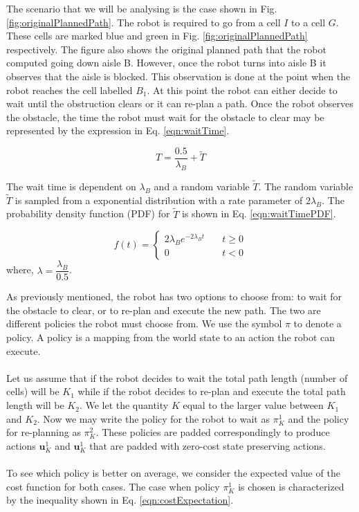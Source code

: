 \documentclass[a4paper,12pt]{article}
\begin{document}
			The scenario that we will be analysing is the case shown in Fig. \ref{fig:originalPlannedPath}. The robot is required to go from a cell $I$ to a cell $G$. These cells are marked blue and green in Fig. \ref{fig:originalPlannedPath} respectively. The figure also shows the original planned path that the robot computed going down aisle B. However, once the robot turns into aisle B it observes that the aisle is blocked. This observation is done at the point when the robot reaches the cell labelled $B_{1}$. At this point the robot can either decide to wait until the obstruction clears or it can re-plan a path. Once the robot observes the obstacle, the time the robot must wait for the obstacle to clear may be represented by the expression in Eq. \ref{eqn:waitTime}. 

			\begin{equation}
				T=\frac{0.5}{\lambda_{B}}+\widetilde{T}
				\label{eqn:waitTime}
			\end{equation}

			The wait time is dependent on $\lambda_{B}$ and a random variable $\widetilde{T}$. The random variable $\widetilde{T}$ is sampled from a exponential distribution with a rate parameter of $2\lambda_{B}$. The probability density function (PDF) for $\widetilde{T}$ is shown in Eq. \ref{eqn:waitTimePDF}. 

			\begin{equation}
				f(t) = 
				\begin{cases}
				2\lambda_{B} e^{-2\lambda_{B} t} & \quad t \geq 0 \\
				0 & \quad t < 0
				\end{cases}
				\label{eqn:waitTimePDF}
			\end{equation}
			where, $\lambda = \dfrac{\lambda_{B}}{0.5}$. 
			
			As previously mentioned, the robot has two options to choose from: to wait for the obstacle to clear, or to re-plan and execute the new path. The two are different policies the robot must choose from. We use the symbol $\pi$ to denote a policy. A policy is a mapping from the world state to an action the robot can execute.
			\\
			\\
			Let us assume that if the robot decides to wait the total path length (number of cells) will be $K_1$ while if the robot decides to re-plan and execute the total path length will be $K_2$. We let the quantity $K$ equal to the larger value between $K_1$ and $K_2$. Now we may write the policy for the robot to wait as $\pi_{K}^{1}$ and the policy for re-planning as $\pi_{K}^{2}$. These policies are padded correspondingly to produce actions $\textbf{u}_{K}^{1}$ and $\textbf{u}_{K}^{1}$ that are padded with zero-cost state preserving actions.
			\\
			\\
			To see which policy is better on average, we consider the expected value of the cost function for both cases. The case when policy $\pi_{K}^{1}$ is chosen is characterized by the inequality shown in Eq. \ref{eqn:costExpectation}.
\end{document}

